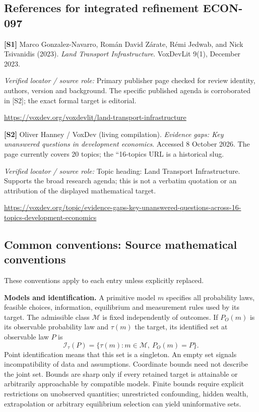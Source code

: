 \documentclass[11pt,a4paper]{article}
\begin{document}
\subsection*{References for integrated refinement ECON-097}
{\footnotesize\raggedright
\par\noindent\textbf{[S1]} Marco Gonzalez-Navarro, Román David Zárate, Rémi Jedwab, and Nick Tsivanidis (2023). \emph{Land Transport Infrastructure}. VoxDevLit 9(1), December 2023.\par \textit{Verified locator / source role:} Primary publisher page checked for review identity, authors, version and background. The specific published agenda is corroborated in [S2]; the exact formal target is editorial.\par \url{https://voxdev.org/voxdevlit/land-transport-infrastructure}\par\smallskip
\par\noindent\textbf{[S2]} Oliver Hanney / VoxDev (living compilation). \emph{Evidence gaps: Key unanswered questions in development economics}. Accessed 8 October 2026. The page currently covers 20 topics; the ``16-topics URL is a historical slug.\par \textit{Verified locator / source role:} Topic heading: Land Transport Infrastructure. Supports the broad research agenda; this is not a verbatim quotation or an attribution of the displayed mathematical target.\par \url{https://voxdev.org/topic/evidence-gaps-key-unanswered-questions-across-16-topics-development-economics}\par\smallskip
}

\subsection*{Common conventions: Source mathematical conventions}

These conventions apply to each entry unless explicitly replaced.

\textbf{Models and identification.} A primitive model \(m\) specifies all probability laws, feasible choices, information, equilibrium and measurement rules used by its target. The admissible class \(\mathcal M\) is fixed independently of outcomes. If \(P_O(m)\) is its observable probability law and \(\tau(m)\) the target, its identified set at observable law \(P\) is
\[
 \mathcal I_\tau(P)=\{\tau(m):m\in\mathcal M,\ P_O(m)=P\}.
\]
Point identification means that this set is a singleton. An empty set signals incompatibility of data and assumptions. Coordinate bounds need not describe the joint set. Bounds are sharp only if every retained target is attainable or arbitrarily approachable by compatible models. Finite bounds require explicit restrictions on unobserved quantities; unrestricted confounding, hidden wealth, extrapolation or arbitrary equilibrium selection can yield uninformative sets.
\end{document}
